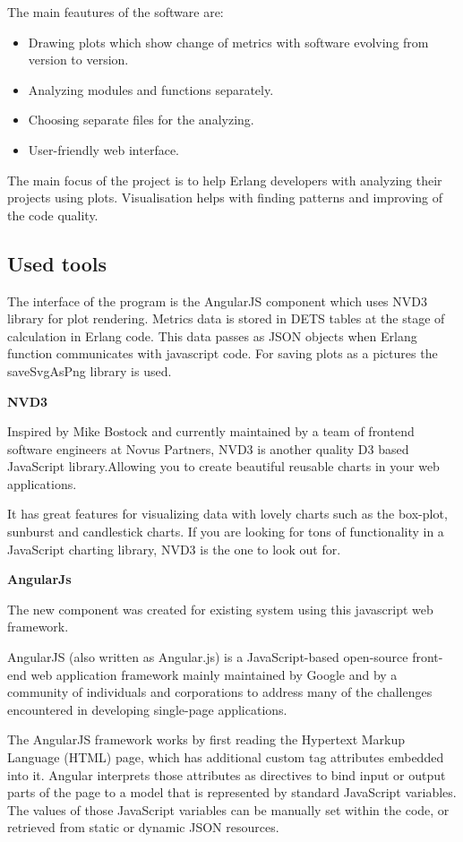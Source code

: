 The main feautures of the software are:
\begin{itemize}
	\item Drawing plots which show change of metrics with software evolving from version to version.
	\item Analyzing modules and functions separately.
	\item Choosing separate files for the analyzing.
	\item User-friendly web interface.
\end{itemize}

The main focus of the project is to help Erlang developers with analyzing their projects using plots. Visualisation helps with finding patterns and improving of the code quality. 

\subsection{Used tools}

The interface of the program is the AngularJS component which uses NVD3 library for plot rendering. Metrics data is stored in DETS tables at the stage of calculation in Erlang code. This data passes as JSON objects when Erlang function communicates with javascript code. For saving plots as a pictures the saveSvgAsPng library is used.

\textbf{NVD3}

Inspired by Mike Bostock and currently maintained by a team of frontend software engineers at Novus Partners, NVD3 is another quality D3 based JavaScript library.Allowing you to create beautiful reusable charts in your web applications.

It has great features for visualizing data with lovely charts such as the box-plot, sunburst and candlestick charts. If you are looking for tons of functionality in a JavaScript charting library, NVD3 is the one to look out for.

\textbf{AngularJs}

The new component was created for existing system using this javascript web framework.

AngularJS (also written as Angular.js) is a JavaScript-based open-source front-end web application framework mainly maintained by Google and by a community of individuals and corporations to address many of the challenges encountered in developing single-page applications.

The AngularJS framework works by first reading the Hypertext Markup Language (HTML) page, which has additional custom tag attributes embedded into it. Angular interprets those attributes as directives to bind input or output parts of the page to a model that is represented by standard JavaScript variables. The values of those JavaScript variables can be manually set within the code, or retrieved from static or dynamic JSON resources. 

